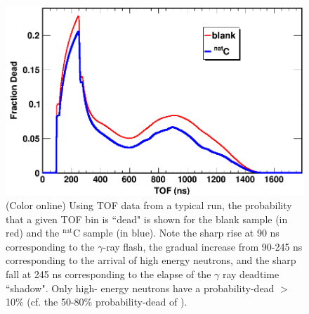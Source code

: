 \documentclass[twocolumn,secnumarabic,amssymb, nobibnotes, aps, prl,
superscriptaddress, nobalancelastpage]{revtex4}
\begin{document}
\begin{figure}
    \includegraphics[scale=0.3]{figures/exampleDeadtimeSpectrum.png}
    \caption{(Color online) Using TOF data from a typical run, the probability that a given 
        TOF bin is ``dead" is shown for the blank sample (in red) and the $^{\text{nat}}$C   
        sample (in blue). Note the sharp rise at 90 ns corresponding to the
        $\gamma$-ray flash, the gradual increase from 90-245 ns corresponding to
        the arrival of high energy neutrons, and the sharp fall at 245 ns
        corresponding to the elapse of the $\gamma$ ray deadtime ``shadow". Only high-
        energy neutrons have a probability-dead $>$10\% (cf. the 50-80\%
        probability-dead of \cite{Finlay1993, Abfalterer2001}).
    }
    \label{ExampleDeadtimeSpectrum}
\end{figure}
\end{document}
